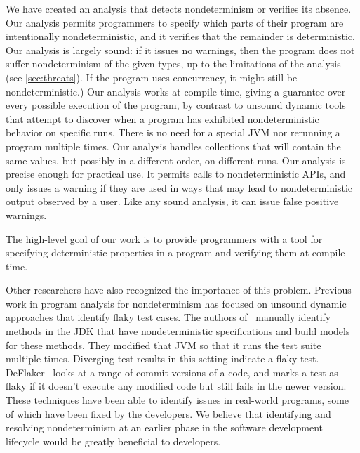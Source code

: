 We have created an analysis that detects nondeterminism or verifies its
absence.
Our analysis permits programmers to specify which parts of their program
are intentionally nondeterministic, and it verifies that the remainder is deterministic.
%
Our analysis is largely sound:  if it issues no warnings, then the program does not
suffer nondeterminism of the given types, up to the limitations of the
analysis (see \cref{sec:threats}).  If the program uses concurrency,
it might still be nondeterministic.)
%
Our analysis works at compile time, giving a guarantee over every possible
execution of the program, by contrast to unsound dynamic tools that attempt
to discover when a program has exhibited nondeterministic behavior on
specific runs.  There is no need for a special JVM nor rerunning a program
multiple times.
%
Our analysis handles collections that will contain the same values, but
possibly in a different order, on different runs.
%
Our analysis is precise enough for practical use.  It permits calls to
nondeterministic APIs, and only issues a warning if they are used in ways
that may lead to nondeterministic output observed by a user.  Like any
sound analysis, it can issue false positive warnings.



The high-level goal of our work is to provide programmers with a tool for
specifying deterministic properties in a program and verifying them
at compile time.


Other researchers have also recognized the importance of this problem.
Previous work in program analysis for nondeterminism has focused on unsound dynamic
approaches that identify flaky test cases.
The authors of~\cite{nondex} manually identify methods in the JDK that have nondeterministic specifications and build models for
these methods. They  modified that JVM so that it runs the test suite multiple times.
Diverging test results in this setting indicate a flaky test. DeFlaker~\cite{deflaker} looks at a range of commit versions
of a code, and marks a test as flaky if it doesn't execute any modified code but still fails in the newer version. These techniques
have been able to identify issues in real-world programs, some of which
have been fixed by the developers. We believe that identifying and
resolving nondeterminism
at an earlier phase in the software development lifecycle would be greatly beneficial to
developers.

